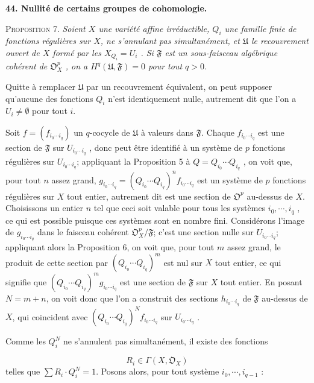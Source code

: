 \textbf{44. Nullité de certains groupes de cohomologie.}

\textsc{Proposition} 7. \textit{Soient $X$ une variété affine irréductible, $Q_i$ une famille finie de fonctions régulières sur $X$, ne s'annulant pas simultanément, et $\mathfrak{U}$ le recouvrement ouvert de $X$ formé par les $X_{Q_i} = U_i$ . Si $\mathfrak{F}$ est un sous-faisceau algébrique cohérent de $\mathfrak{O}^p_X$ , on a $H^q(\mathfrak{U}, \mathfrak{F}) = 0$ pour tout $q > 0$.}

Quitte à remplacer $\mathfrak{U}$ par un recouvrement équivalent, on peut supposer qu'aucune des fonctions $Q_i$ n'est identiquement nulle, autrement dit que l'on a $U_i \neq \emptyset$ pour tout $i$.

Soit $f = (f_{i_0 \cdots i_q})$ un $q$-cocycle de $\mathfrak{U}$ à valeurs dans $\mathfrak{F}$. Chaque $f_{i_0 \cdots i_q}$ est une section de $\mathfrak{F}$ sur $U_{i_0 \cdots i_q}$ , donc peut être identifié à un système de $p$ fonctions régulières sur $U_{i_0 \cdots i_q}$; appliquant la Proposition 5 à $Q = Q_{i_0} \cdots Q_{i_q}$ , on voit que, pour tout $n$ assez grand, $g_{i_0 \cdots i_q} = (Q_{i_0} \cdots Q_{i_q})^n f_{i_0 \cdots i_q}$ est un système de $p$ fonctions régulières sur $X$ tout entier, autrement dit est une section de $\mathfrak{O}^p$ au-dessus de $X$. Choisissons un entier $n$ tel que ceci soit valable pour tous les systèmes $i_0 , \cdots , i_q$ , ce qui est possible puisque ces systèmes sont en nombre fini. Considérons l'image de $g_{i_0 \cdots i_q}$ dans le faisceau cohérent $\mathfrak{O}^p_X/\mathfrak{F}$; c'est une section nulle sur $U_{i_0 \cdots i_q}$; appliquant alors la Proposition 6, on voit que, pour tout $m$ assez grand, le produit de cette section par $(Q_{i_0} \cdots Q_{i_q})^m$ est nul sur $X$ tout entier, ce qui signifie que $(Q_{i_0} \cdots Q_{i_q})^m g_{i_0 \cdots i_q}$ est une section de $\mathfrak{F}$ sur $X$ tout entier. En posant $N = m + n$, on voit donc que l'on a construit des sections $h_{i_0 \cdots i_q}$ de $\mathfrak{F}$ au-dessus de $X$, qui coincident avec $(Q_{i_0} \cdots Q_{i_q})^N f_{i_0 \cdots i_q}$ sur $U_{i_0 \cdots i_q}$ .

Comme les $Q_i^N$ ne s'annulent pas simultanément, il existe des fonctions

\begin{equation*}
R_i \in \Gamma(X, \mathfrak{O}_X)
\end{equation*}
telles que $\sum R_i \cdot Q_i^N = 1$. Posons alors, pour tout système $i_0 , \cdots , i_{q-1}$ :

